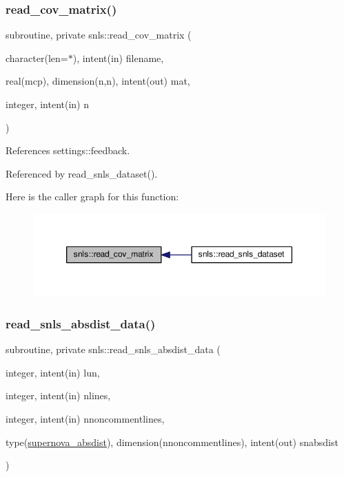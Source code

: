 \subsubsection{\texorpdfstring{read\+\_\+cov\+\_\+matrix()}{read\_cov\_matrix()}}
{\footnotesize\ttfamily subroutine, private snls\+::read\+\_\+cov\+\_\+matrix (\begin{DoxyParamCaption}\item[{character(len=$\ast$), intent(in)}]{filename,  }\item[{real(mcp), dimension(n,n), intent(out)}]{mat,  }\item[{integer, intent(in)}]{n }\end{DoxyParamCaption})\hspace{0.3cm}{\ttfamily [private]}}



References settings\+::feedback.



Referenced by read\+\_\+snls\+\_\+dataset().

Here is the caller graph for this function\+:
\nopagebreak
\begin{figure}[H]
\begin{center}
\leavevmode
\includegraphics[width=350pt]{namespacesnls_a7ebffb6abfd2942fbb0304d2ba6a234a_icgraph}
\end{center}
\end{figure}
\mbox{\label{namespacesnls_aac6e7755970b914ec53a7e7f2c6ad529}} 
\subsubsection{\texorpdfstring{read\+\_\+snls\+\_\+absdist\+\_\+data()}{read\_snls\_absdist\_data()}}
{\footnotesize\ttfamily subroutine, private snls\+::read\+\_\+snls\+\_\+absdist\+\_\+data (\begin{DoxyParamCaption}\item[{integer, intent(in)}]{lun,  }\item[{integer, intent(in)}]{nlines,  }\item[{integer, intent(in)}]{nnoncommentlines,  }\item[{type(\mbox{\hyperlink{structsnls_1_1supernova__absdist}{supernova\+\_\+absdist}}), dimension(nnoncommentlines), intent(out)}]{snabsdist }\end{DoxyParamCaption})\hspace{0.3cm}{\ttfamily [private]}}



